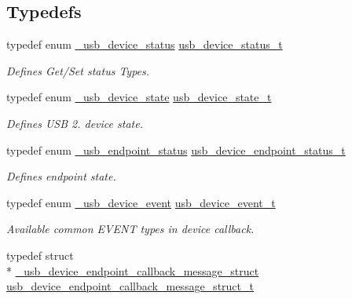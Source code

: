\subsection*{Typedefs}
\begin{DoxyCompactItemize}
\item 
typedef enum \hyperlink{group__usb__device__driver_gad091bd3169bf45debbe8b5aba78d6091}{\-\_\-usb\-\_\-device\-\_\-status} \hyperlink{group__usb__device__driver_ga11ab1b56db153ac62eecf01661216bbf}{usb\-\_\-device\-\_\-status\-\_\-t}
\begin{DoxyCompactList}\small\item\em Defines Get/\-Set status Types. \end{DoxyCompactList}\item 
typedef enum \hyperlink{group__usb__device__driver_ga6c3587990ca428244271f14efc909522}{\-\_\-usb\-\_\-device\-\_\-state} \hyperlink{group__usb__device__driver_gadb6af69c6a5a2124b197210e41ed8256}{usb\-\_\-device\-\_\-state\-\_\-t}
\begin{DoxyCompactList}\small\item\em Defines U\-S\-B 2. device state. \end{DoxyCompactList}\item 
typedef enum \hyperlink{group__usb__device__driver_ga58f9c3f9e1aeb5f669a4cb58556ed53f}{\-\_\-usb\-\_\-endpoint\-\_\-status} \hyperlink{group__usb__device__driver_gaaefd48322932e1e70d5c4b4674e19796}{usb\-\_\-device\-\_\-endpoint\-\_\-status\-\_\-t}
\begin{DoxyCompactList}\small\item\em Defines endpoint state. \end{DoxyCompactList}\item 
typedef enum \hyperlink{group__usb__device__driver_gac66a5e6b9c677f9d8d4f782aa62df540}{\-\_\-usb\-\_\-device\-\_\-event} \hyperlink{group__usb__device__driver_ga35623b5263f88037a497e6c6c363b8f1}{usb\-\_\-device\-\_\-event\-\_\-t}
\begin{DoxyCompactList}\small\item\em Available common E\-V\-E\-N\-T types in device callback. \end{DoxyCompactList}\item 
typedef struct \\*
\hyperlink{struct__usb__device__endpoint__callback__message__struct}{\-\_\-usb\-\_\-device\-\_\-endpoint\-\_\-callback\-\_\-message\-\_\-struct} \hyperlink{group__usb__device__driver_ga291e21595b67e07488baad293f707e5f}{usb\-\_\-device\-\_\-endpoint\-\_\-callback\-\_\-message\-\_\-struct\-\_\-t}

\end{DoxyCompactItemize}
